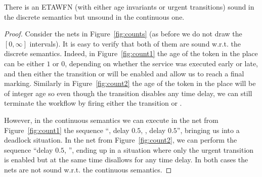 \begin{theorem} \label{thm:counterex}
There is an ETAWFN (with either age invariants
or urgent transitions) sound in the
discrete semantics but unsound in the continuous one.
\end{theorem}
\begin{proof}
Consider the nets in Figure~\ref{fig:counts} (as before we do not
draw the $[0,\infty]$ intervals). It is easy to verify that
both of them are sound w.r.t. the discrete semantics. Indeed,
in Figure~\ref{fig:count1} the age of the token in the place
 can be either $1$ or $0$, depending on whether the
service was executed early or late, and then either the transition
 or  will be enabled and allow us to reach a
final marking. Similarly in Figure~\ref{fig:count2} the age of the token
in the place  will be of integer age so even though the transition
 disables any time delay, we can still terminate the workflow
by firing either the transition  or .

However, in the continuous semantics we can execute in the net
from Figure~\ref{fig:count1} the sequence
``, delay $0.5$, , delay $0.5$'', bringing us
into a deadlock situation. In the net from Figure~\ref{fig:count2},
we can perform the sequence ``delay $0.5$, '', ending up
in a situation where only the urgent transition
 is enabled but at the same time disallows for any time delay.
In both cases the nets are not sound w.r.t. the continuous semantics.
\end{proof}
